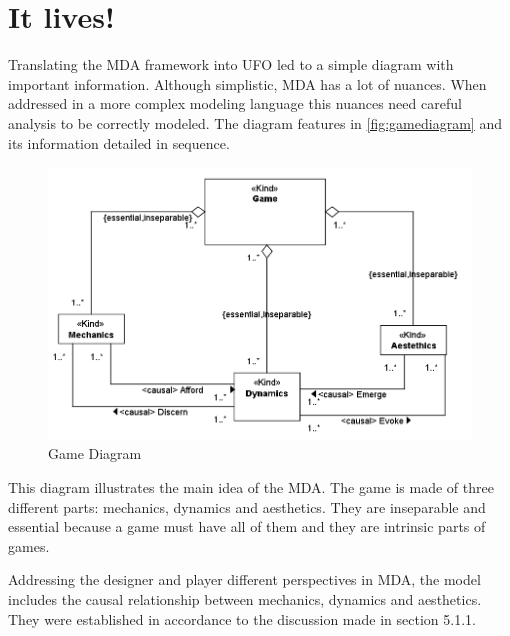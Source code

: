 \section{It lives!}



Translating the MDA framework into UFO led to a simple diagram with important information. Although simplistic, MDA has a lot of nuances. When addressed in a more complex modeling language this nuances need careful analysis to be correctly modeled. The diagram features in \autoref{fig:gamediagram} and its information detailed in sequence.

\begin{figure}[!h]
    \centering
    \includegraphics[scale=0.65]{Images/Model/Game.png}
    \caption{Game Diagram}
    \label{fig:gamediagram}
\end{figure}

This diagram illustrates the main idea of the MDA. The game is made of three different parts: mechanics, dynamics and aesthetics. They are inseparable and essential because a game must have all of them and they are intrinsic parts of games.

Addressing the designer and player different perspectives in MDA, the model includes the causal relationship between mechanics, dynamics and aesthetics. They were established in accordance to the discussion made in section 5.1.1.

